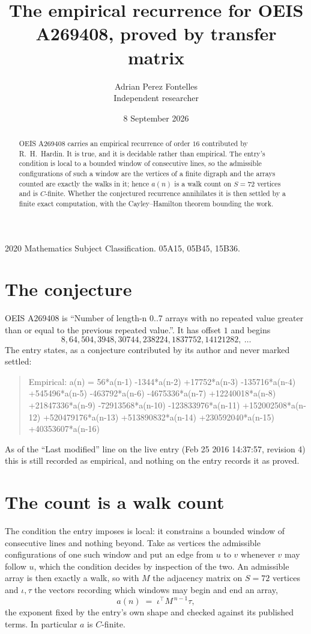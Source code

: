 \documentclass[11pt,a4paper]{article}
\title{The empirical recurrence for OEIS A269408, proved by transfer matrix}
\author{Adrian Perez Fontelles\\ \small Independent researcher}
\date{8 September 2026}
\theoremstyle{plain}
\theoremstyle{definition}
\begin{document}
\maketitle

\begin{abstract}
OEIS A269408 carries an empirical recurrence of order $16$ contributed by R.~H.~Hardin. It is
true, and it is decidable rather than empirical. The entry's condition is local to a bounded window of consecutive lines, so
the admissible configurations of such a window are the vertices of a finite digraph and the
arrays counted are exactly the walks in it; hence $a(n)$ is a walk count on $S=72$ vertices
and is $C$-finite. Whether the conjectured recurrence annihilates it is then settled by a
finite exact computation, with the Cayley--Hamilton theorem bounding the work.
\end{abstract}

\noindent\small 2020 Mathematics Subject Classification. 05A15, 05B45, 15B36.\normalsize

\section{The conjecture}

OEIS A269408 is ``Number of length-n 0..7 arrays with no repeated value greater than or equal to the previous repeated value.''. It has offset $1$ and begins
\[
8, 64, 504, 3948, 30744, 238224, 1837752, 14121282,\ \dots
\]
The entry states, as a conjecture contributed by its author and never marked settled:
\begin{quote}
Empirical: a(n) = 56*a(n-1) -1344*a(n-2) +17752*a(n-3) -135716*a(n-4) +545496*a(n-5) -463792*a(n-6) -4675336*a(n-7) +12240018*a(n-8) +21847336*a(n-9) -72913568*a(n-10) -123833976*a(n-11) +152002508*a(n-12) +520479176*a(n-13) +513890832*a(n-14) +230592040*a(n-15) +40353607*a(n-16)
\end{quote}
As of the ``Last modified'' line on the live entry (Feb 25 2016 14:37:57, revision 4) this is still
recorded as empirical, and nothing on the entry records it as proved.

\section{The count is a walk count}

The condition the entry imposes is local: it constrains a bounded window of consecutive lines and nothing beyond. Take as
vertices the admissible configurations of one such window and put an edge from $u$ to $v$
whenever $v$ may follow $u$, which the condition decides by inspection of the two. An
admissible array is then exactly a walk, so with $M$ the adjacency matrix on $S=72$ vertices
and $\iota,\tau$ the vectors recording which windows may begin and end an array,
\[
a(n)\;=\;\iota^{\!\top}M^{\,n-1}\tau ,
\]
the exponent fixed by the entry's own shape and checked against its published terms. In
particular $a$ is $C$-finite.
\end{document}
